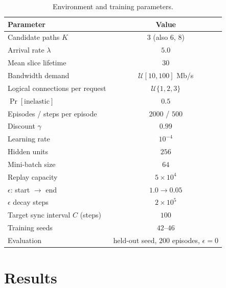 \documentclass[10pt,journal,comsoc]{IEEEtran}
\begin{document}
\begin{table}[t]
\centering
\caption{Environment and training parameters.}
\label{tab:hyper}
\renewcommand{\arraystretch}{1.12}
\begin{tabular}{lc}
\toprule
\textbf{Parameter} & \textbf{Value} \\
\midrule
Candidate paths $K$              & $3$ (also $6$, $8$) \\
Arrival rate $\lambda$           & $5.0$ \\
Mean slice lifetime              & $30$ \\
Bandwidth demand                 & $\mathcal{U}[10,100]$ Mb/s \\
Logical connections per request  & $\mathcal{U}\{1,2,3\}$ \\
$\Pr[\text{inelastic}]$          & $0.5$ \\
\midrule
Episodes / steps per episode     & $2000$ / $500$ \\
Discount $\gamma$                & $0.99$ \\
Learning rate                    & $10^{-4}$ \\
Hidden units                     & $256$ \\
Mini-batch size                  & $64$ \\
Replay capacity                  & $5\times10^{4}$ \\
$\epsilon$: start $\to$ end      & $1.0 \to 0.05$ \\
$\epsilon$ decay steps           & $2\times10^{5}$ \\
Target sync interval $C$ (steps) & $100$ \\
Training seeds                   & $42$--$46$ \\
Evaluation                       & held-out seed, $200$ episodes, $\epsilon=0$ \\
\bottomrule
\end{tabular}
\end{table}

\section{Results} \label{results}
\end{document}

